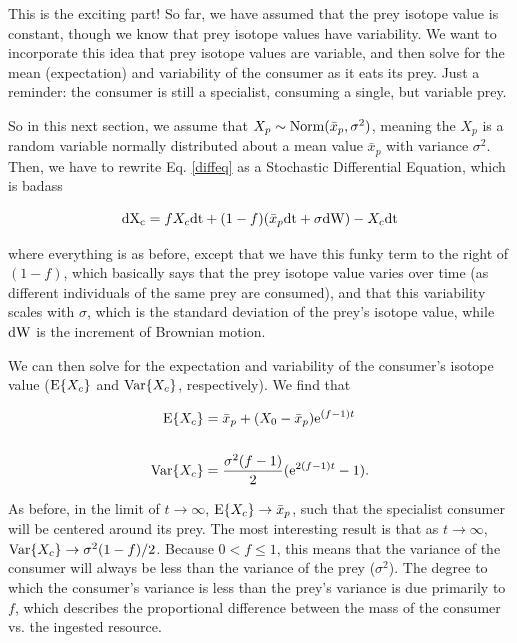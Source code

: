 \documentclass[11pt]{article}
\begin{document}
This is the exciting part! So far, we have assumed that the prey isotope value is constant, though we know that prey isotope values have variability.
We want to incorporate this idea that prey isotope values are variable, and then solve for the mean (expectation) and variability of the consumer as it eats its prey.
Just a reminder: the consumer is still a specialist, consuming a single, but variable prey.

So in this next section, we assume that $X_p \sim {\rm Norm}(\bar{x}_p,\sigma^2)$, meaning the $X_p$ is a random variable normally distributed about a mean value $\bar{x}_p$ with variance $\sigma^2$.
Then, we have to rewrite Eq. \ref{diffeq} as a Stochastic Differential Equation, which is badass

\begin{equation}
	{\rm dX_c} = fX_c{\rm dt} + (1-f)(\bar{x}_p{\rm dt} + \sigma{\rm dW}) - X_c{\rm dt}
\end{equation}

\noindent where everything is as before, except that we have this funky term to the right of $(1-f)$, which basically says that the prey isotope value varies over time (as different individuals of the same prey are consumed), and that this variability scales with $\sigma$, which is the standard deviation of the prey's isotope value, while ${\rm dW}$ is the increment of Brownian motion.

We can then solve for the expectation and variability of the consumer's isotope value (${\rm E}\{X_c\}$ and ${\rm Var}\{X_c\}$, respectively).
We find that

\begin{align}
	{\rm E}\{X_c\} &= \bar{x}_p + (X_0-\bar{x}_p){\rm e}^{(f-1)t} \nonumber \\ \nonumber \\ 
	{\rm Var}\{X_c\} &= \frac{\sigma^2(f-1)}{2}({\rm e}^{2(f-1)t} -1).
\end{align}

\noindent As before, in the limit of $t \rightarrow \infty$, ${\rm E}\{X_c\} \rightarrow \bar{x}_p$, such that the specialist consumer will be centered around its prey.
The most interesting result is that as $t \rightarrow \infty$, ${\rm Var}\{X_c\} \rightarrow \sigma^2(1-f)/2$.
Because $0 < f \leq 1$, this means that the variance of the consumer will always be less than the variance of the prey ($\sigma^2$).
The degree to which the consumer's variance is less than the prey's variance is due primarily to $f$, which describes the proportional difference between the mass of the consumer vs. the ingested resource.
\end{document}
